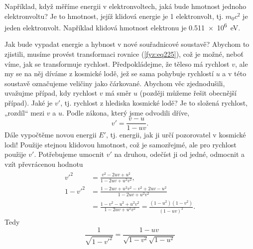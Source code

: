     Například, když měříme energii v elektronvoltech, jaká bude hmotnost jednoho elektronvoltu? Je 
    to hmotnost, jejíž klidová energie je \num{1} elektronvolt, tj. \(m_0c^2\) je jeden 
    elektronvolt. Například klidová hmotnost elektronu je \qty{0.511e6}{\electronvolt}.
    
    Jak bude vypadat energie a hybnost v nové souřadnicové soustavě? Abychom to zjistili, musíme 
    provést transformaci rovnice (\ref{fyz:eq225}), což je možné, neboť víme, jak se transformuje 
    rychlost. Předpokládejme, že těleso má rychlost \(v\), ale my se na něj díváme z kosmické lodě, 
    jež se sama pohybuje rychlostí \(u\) a v této soustavě označujeme veličiny jako čárkované. 
    Abychom věc zjednodušili, uvažujme případ, kdy rychlost \(v\) má směr \(u\) (později můžeme 
    řešit obecnější případ). Jaké je \(v'\), tj. rychlost z hlediska kosmické lodě? Je to složená 
    rychlost, „rozdíl“ mezi \(v\) a \(u\). Podle zákona, který jsme odvodili dříve,
    \begin{equation}\label{fyz:eq227}
      v' = \frac{v-u}{1-uv}.
    \end{equation}
    Dále vypočtěme novou energii \(E'\), tj. energii, jak ji určí pozorovatel v kosmické lodi! 
    Použije stejnou klidovou hmotnost, což je samozřejmé, ale pro rychlost použije \(v'\). 
    Potřebujeme umocnit \(v'\) na druhou, odečíst ji od jedné, odmocnit a vzít převrácenou hodnotu
    \begin{gather*}
      \begin{aligned}
            {v'}^2 &= \frac{v^2 - 2uv + u^2}{1 - 2uv + u^2v^2}, \\
        1 - {v'}^2 &= \frac{1 - 2uv + u^2v^2 - v^2 + 2uv - u^2}{1 - 2uv + u^2v^2}  \\
                   &= \frac{1 - v^2 - u^2 + u^2v^2}{1 - 2uv + u^2v^2}             
                    = \frac{(1-u^2)(1-v^2)}{(1 - uv)^2}.
      \end{aligned}  
    \end{gather*}
    Tedy
    \begin{equation}\label{fyz:eq228}
      \frac{1}{\sqrt{1 - {v'}^2}} = \frac{1-uv}{\sqrt{1-v^2}\sqrt{1-u^2}}
    \end{equation}

